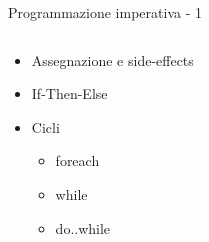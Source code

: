 \begin{frame}{Programmazione imperativa - 1}

	\begin{columns}
		\begin{column}{0.5\textwidth}
			\begin{itemize}
				\item Assegnazione e side-effects
				\item If-Then-Else
				\item Cicli
				\begin{itemize}
					\item foreach
					\item while
					\item do..while
				\end{itemize}
			\end{itemize}
		\end{column}

		\begin{column}{0.5\textwidth}
			

\end{column}
\end{columns}
\end{frame}
